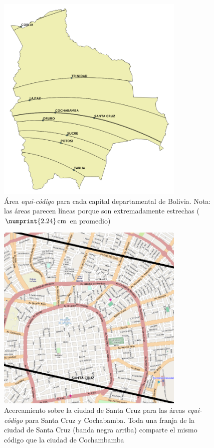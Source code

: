 \documentclass[letterpaper]{article}
\begin{document}
\begin{figure}[p]
    \centering
    \includegraphics[width=0.8\textwidth]{resultados/area_equi_codigo_9_capitales.png}
    \caption{Área \emph{equi-código} para cada capital departamental de Bolivia. Nota: las áreas parecen líneas porque son extremadamente estrechas (\(\numprint{2.24}\,\mathrm{cm}\) en promedio)}
    \label{fig:areas_por_capital}
\end{figure}

\begin{figure}[p]
    \centering
    \includegraphics[width=0.8\textwidth]{resultados/area_equi_codigo_santacruz_cochabamba.png}
    \caption{Acercamiento sobre la ciudad de Santa Cruz para las áreas \emph{equi-código} para Santa Cruz y Cochabamba. Toda una franja de la ciudad de Santa Cruz (banda negra arriba) comparte el mismo código que la ciudad de Cochambamba}
    \label{fig:areas_por_capital_santacruz_cochabamba}
\end{figure}
\end{document}
